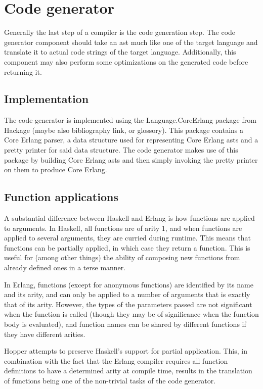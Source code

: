 \section{Code generator}


Generally the last step of a compiler is the code generation step. The code generator
component should take an \gls{ast} much like one of the target language and translate it
to actual code strings of the target language. Additionally, this component may also
perform some optimizations on the generated code before returning it.

\subsection{Implementation}

The code generator is implemented using the Language.CoreErlang \cite{CoreErlang} package
from Hackage (maybe also bibliography link, or glossory). This package contains a Core Erlang
parser, a data structure used for representing Core Erlang \gls{ast}s and a pretty printer for
said data structure. The code generator makes use of this package by building Core Erlang
\gls{ast}s and then simply invoking the pretty printer on them to  produce Core Erlang.

\subsection{Function applications}

A substantial difference between Haskell and Erlang is how functions are applied to arguments. 
In Haskell, all functions are of arity 1, and when functions are applied to several arguments, they are curried during runtime. This means that functions can be partially applied, in which case they return a function. This is useful for (among other things) the ability of composing new functions from already defined ones in a terse manner.

In Erlang, functions (except for anonymous functions) are identified by its name and its arity, and can only be applied to a number of arguments that is exactly that of its arity. However, the types of the parameters passed are not significant when the function is called (though they may be of significance when the function body is evaluated), and function names can be shared by different functions if they have different arities.

Hopper attempts to preserve Haskell's support for partial application. This, in combination with the fact that the Erlang compiler requires all function definitions to have a determined arity at compile time, results in the translation of functions being one of the non-trivial tasks of the code generator.

